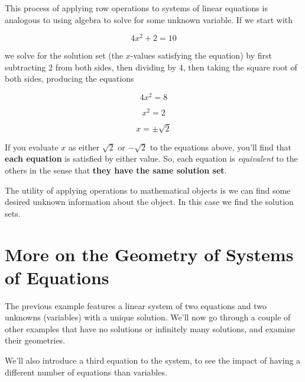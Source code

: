 \documentclass{ximera}
\begin{document}
    \begin{remark}
      This process of applying row operations to systems of linear equations is analogous to using algebra to solve for some unknown variable. If we start with 
      
      $$4x^2+2=10$$
      
      we solve for the solution set (the $x$-values satisfying the equation) by first subtracting 2 from both sides, then dividing by 4, then taking the square root of both sides, producing the equations
      
      $$4x^2=8$$
      
      $$x^2=2$$
      
      $$x=\pm\sqrt{2}$$
      
      If you evaluate $x$ as either $\sqrt{2}$ or $-\sqrt{2}$ to the equations above, you'll find that \textbf{each equation} is satisfied by either value. So, each equation is \emph{equivalent} to the others in the sense that \textbf{they have the same solution set}.
      
      The utility of applying operations to mathematical objects is we can find some desired unknown information about the object. In this case we find the solution sets.
      
      \end{remark}



  \section*{More on the Geometry of Systems of Equations}
    
    The previous example features a linear system of two equations and two unknowns (variables) with a unique solution. We'll now go through a couple of other examples that have no solutions or infinitely many solutions, and examine their geometries. 
    
    We'll also introduce a third equation to the system, to see the impact of having a different number of equations than variables.
    
\end{document}
